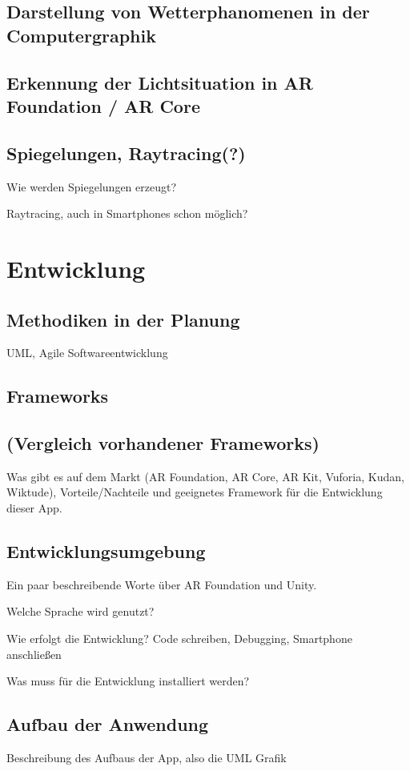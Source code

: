 \subsection{Darstellung von Wetterphanomenen in der Computergraphik}
\subsection{Erkennung der Lichtsituation in AR Foundation / AR Core}
\subsection{Spiegelungen, Raytracing(?)}
Wie werden Spiegelungen erzeugt?

Raytracing, auch in Smartphones schon möglich?

\section{Entwicklung}
\subsection{Methodiken in der Planung}
UML, Agile Softwareentwicklung

\subsection{Frameworks}
\subsection{(Vergleich vorhandener Frameworks)}
Was gibt es auf dem Markt (AR Foundation, AR Core, AR Kit, Vuforia, Kudan, Wiktude), Vorteile/Nachteile und geeignetes Framework für die Entwicklung dieser App.
\subsection{Entwicklungsumgebung}
Ein paar beschreibende Worte über AR Foundation und Unity.

Welche Sprache wird genutzt?

Wie erfolgt die Entwicklung? Code schreiben, Debugging, Smartphone anschließen

Was muss für die Entwicklung installiert werden?

\subsection{Aufbau der Anwendung}
Beschreibung des Aufbaus der App, also die UML Grafik

